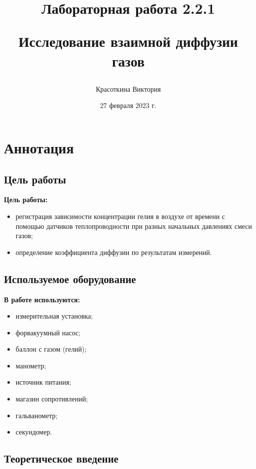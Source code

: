 \documentclass[a4paper,12pt]{article}
\author{Красоткина Виктория}
\title{Лабораторная работа 2.2.1

Исследование взаимной диффузии газов}
\date{27 февраля 2023 г.}
\begin{document}
\maketitle
\thispagestyle{empty}

\newpage
\setcounter{page}{1}

\section{Аннотация}
\subsection{Цель работы}

\textbf{Цель работы:} 
\begin{itemize}
	\item регистрация зависимости концентрации гелия в воздухе от времени с помощью датчиков теплопроводности при разных начальных давлениях смеси газов; 
	\item определение коэффициента диффузии по результатам измерений.
\end{itemize}

\subsection{Используемое оборудование}

\textbf{В работе используются:} 
\begin{itemize}
	\item измерительная установка;
	\item форвакуумный насос;
	\item баллон с газом (гелий);
	\item манометр;
	\item источник питания;
	\item магазин сопротивлений;
	\item гальванометр;
	\item секундомер.
\end{itemize}

\subsection{Теоретическое введение}
\end{document}
